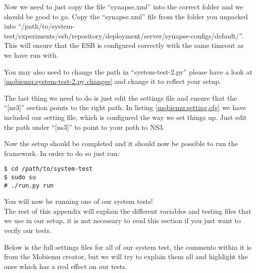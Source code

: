 Now we need to just copy the file “synapse.xml” into the correct folder and we should be good to go. Copy the “synapse.xml” file from the folder you unpacked into “/path/to/system-test/experiments/esb/repository/deployment/server/synapse-configs/default/”. This will ensure that the ESB is configured correctly with the same timeout as we have run with.

You may also need to change the path in “system-test-2.py” please have a look at \ref{mobiemu:system-test-2.py changes} and change it to reflect your setup.

The last thing we need to do is just edit the settings file and ensure that the “[ns3]” section points to the right path. In listing \ref{mobiemu:setting.cfg} we have included our setting file, which is configured the way we set things up. Just edit the path under “[ns3]” to point to your path to NS3.

Now the setup should be completed and it should now be possible to run the framework. In order to do so just run:
\lstset{language=bash, style=bash}
\begin{lstlisting}[frame=single, caption={Run Mobiemu}, label=mobiemu:run, breaklines=true]
$ cd /path/to/system-test
$ sudo su
# ./run.py run
\end{lstlisting}

You will now be running one of our system tests!\\

The rest of this appendix will explain the different variables and testing files that we use in our setup, it is not necessary to read this section if you just want to verify our tests.

Below is the full settings files for all of our system test, the comments within it is from the Mobiemu creator, but we will try to explain them all and highlight the ones which has a real effect on our tests.

